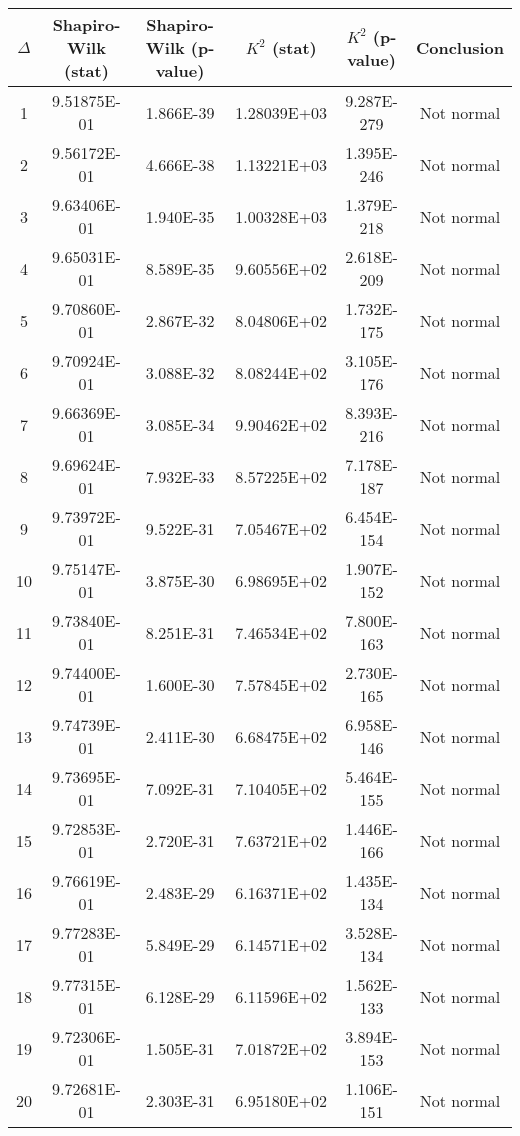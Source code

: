 \begin{table}[h]
	\begin{tabular}{|c|c|c|c|c|c|}
		\hline
		$\Delta$ &  Shapiro-Wilk (stat) & Shapiro-Wilk (p-value) & $K^2$ (stat) & $K^2$ (p-value) & Conclusion\\\hline
		\hline
		1 & 9.51875E-01 & 1.866E-39 & 1.28039E+03 & 9.287E-279 & Not normal\\\hline
		2 & 9.56172E-01 & 4.666E-38 & 1.13221E+03 & 1.395E-246 & Not normal\\\hline
		3 & 9.63406E-01 & 1.940E-35 & 1.00328E+03 & 1.379E-218 & Not normal\\\hline
		4 & 9.65031E-01 & 8.589E-35 & 9.60556E+02 & 2.618E-209 & Not normal\\\hline
		5 & 9.70860E-01 & 2.867E-32 & 8.04806E+02 & 1.732E-175 & Not normal\\\hline
		6 & 9.70924E-01 & 3.088E-32 & 8.08244E+02 & 3.105E-176 & Not normal\\\hline
		7 & 9.66369E-01 & 3.085E-34 & 9.90462E+02 & 8.393E-216 & Not normal\\\hline
		8 & 9.69624E-01 & 7.932E-33 & 8.57225E+02 & 7.178E-187 & Not normal\\\hline
		9 & 9.73972E-01 & 9.522E-31 & 7.05467E+02 & 6.454E-154 & Not normal\\\hline
		10 & 9.75147E-01 & 3.875E-30 & 6.98695E+02 & 1.907E-152 & Not normal\\\hline
		11 & 9.73840E-01 & 8.251E-31 & 7.46534E+02 & 7.800E-163 & Not normal\\\hline
		12 & 9.74400E-01 & 1.600E-30 & 7.57845E+02 & 2.730E-165 & Not normal\\\hline
		13 & 9.74739E-01 & 2.411E-30 & 6.68475E+02 & 6.958E-146 & Not normal\\\hline
		14 & 9.73695E-01 & 7.092E-31 & 7.10405E+02 & 5.464E-155 & Not normal\\\hline
		15 & 9.72853E-01 & 2.720E-31 & 7.63721E+02 & 1.446E-166 & Not normal\\\hline
		16 & 9.76619E-01 & 2.483E-29 & 6.16371E+02 & 1.435E-134 & Not normal\\\hline
		17 & 9.77283E-01 & 5.849E-29 & 6.14571E+02 & 3.528E-134 & Not normal\\\hline
		18 & 9.77315E-01 & 6.128E-29 & 6.11596E+02 & 1.562E-133 & Not normal\\\hline
		19 & 9.72306E-01 & 1.505E-31 & 7.01872E+02 & 3.894E-153 & Not normal\\\hline
		20 & 9.72681E-01 & 2.303E-31 & 6.95180E+02 & 1.106E-151 & Not normal\\\hline

\end{tabular}
\end{table}
